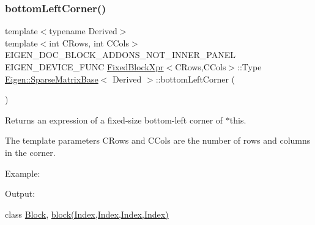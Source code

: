 \subsubsection{\texorpdfstring{bottomLeftCorner()}{bottomLeftCorner()}\hspace{0.1cm}{\footnotesize\ttfamily [2/3]}}
{\footnotesize\ttfamily template$<$typename Derived$>$ \\
template$<$int C\+Rows, int C\+Cols$>$ \\
E\+I\+G\+E\+N\+\_\+\+D\+O\+C\+\_\+\+B\+L\+O\+C\+K\+\_\+\+A\+D\+D\+O\+N\+S\+\_\+\+N\+O\+T\+\_\+\+I\+N\+N\+E\+R\+\_\+\+P\+A\+N\+EL E\+I\+G\+E\+N\+\_\+\+D\+E\+V\+I\+C\+E\+\_\+\+F\+U\+NC \mbox{\hyperlink{struct_eigen_1_1_sparse_matrix_base_1_1_fixed_block_xpr}{Fixed\+Block\+Xpr}}$<$C\+Rows,C\+Cols$>$\+::Type \mbox{\hyperlink{class_eigen_1_1_sparse_matrix_base}{Eigen\+::\+Sparse\+Matrix\+Base}}$<$ Derived $>$\+::bottom\+Left\+Corner (\begin{DoxyParamCaption}{ }\end{DoxyParamCaption})\hspace{0.3cm}{\ttfamily [inline]}}

\begin{DoxyReturn}{Returns}
an expression of a fixed-\/size bottom-\/left corner of $\ast$this.
\end{DoxyReturn}
The template parameters C\+Rows and C\+Cols are the number of rows and columns in the corner.

Example\+: 
\begin{DoxyCodeInclude}{0}
\end{DoxyCodeInclude}
 Output\+: 
\begin{DoxyVerbInclude}
\end{DoxyVerbInclude}
 class \mbox{\hyperlink{class_eigen_1_1_block}{Block}}, \mbox{\hyperlink{class_eigen_1_1_sparse_matrix_base_a7c28a2f511181c727396d5e813519d38}{block(\+Index,\+Index,\+Index,\+Index)}} \mbox{\label{class_eigen_1_1_sparse_matrix_base_a311507cde6d998e651ec6b41c550f6c2}} 

